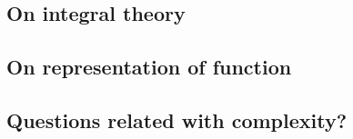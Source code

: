 
\subsection{On integral theory}\label{sec:integral}

\subsection{On representation of function}\label{sec:function}

\subsection{Questions related with complexity?}\label{sec:complexity}
